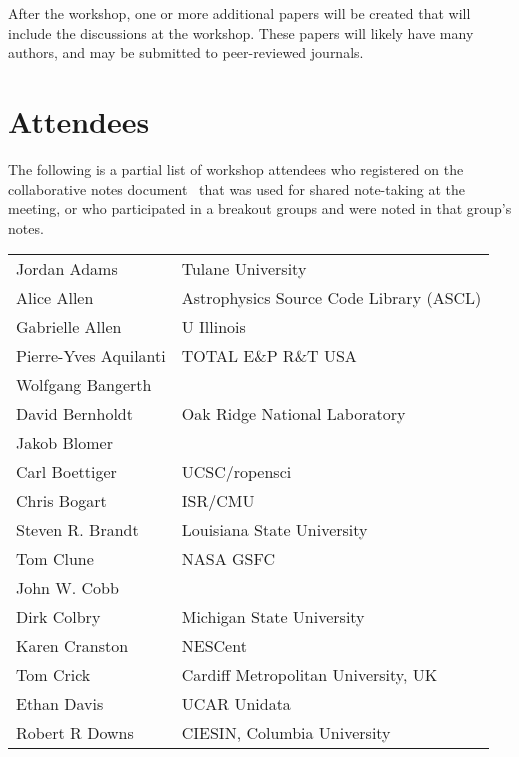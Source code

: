 \documentclass[11pt, oneside]{amsart}
\begin{document}
After the workshop, one or more additional papers will be created that will include the discussions at the workshop.  These papers will likely have many authors, and may be submitted to peer-reviewed journals.

\appendix

\section{Attendees}
\label{sec:attendees}

The following is a partial list of workshop attendees who registered on the
collaborative notes document~\cite{WSSSPE2-google-notes} that was used
for shared note-taking at the meeting, or who participated in a breakout groups
and were noted in that group's notes.

\begin{longtable}{ll}
Jordan Adams          &  Tulane University                       \\
Alice Allen           &  Astrophysics Source Code Library (ASCL) \\
Gabrielle Allen       &  U Illinois                              \\
Pierre-Yves Aquilanti &  TOTAL E\&P R\&T USA                     \\
Wolfgang Bangerth     \\
David Bernholdt       &  Oak Ridge National Laboratory           \\
Jakob Blomer          \\
Carl Boettiger        &  UCSC/ropensci                           \\
Chris Bogart          &  ISR/CMU                                 \\
Steven R. Brandt      &  Louisiana State University              \\
Tom Clune             &  NASA GSFC                               \\
John W. Cobb          \\
Dirk Colbry           &  Michigan State University               \\
Karen Cranston        &  NESCent                                 \\
Tom Crick             &  Cardiff Metropolitan University, UK     \\
Ethan Davis           &  UCAR Unidata                            \\
Robert R Downs        &  CIESIN, Columbia University             \\

\end{longtable}
\end{document}

